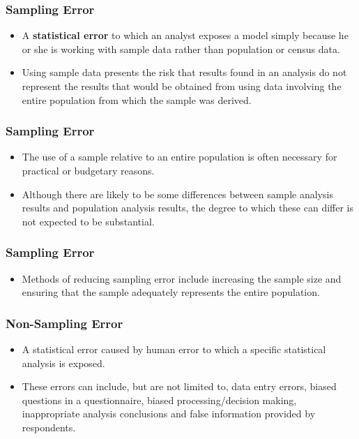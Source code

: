 \documentclass{beamer}
\begin{document}


\begin{frame}
\frametitle{Sampling Error}
\Large
\begin{itemize}
\item A \textbf{statistical error} to which an analyst exposes a model simply because he or she is working with sample data rather than population or census data.
\item Using sample data presents the risk that results found in an analysis do not represent the results that would be 
obtained from using data involving the entire population from which the sample was derived.
\end{itemize}
\end{frame}
\begin{frame}
\frametitle{Sampling Error}
\Large
\begin{itemize}
\item The use of a sample relative to an entire population is often necessary for practical or budgetary reasons. 
\item Although there are likely to be some differences between sample analysis results and population analysis results, the degree to which these can 
differ is not expected to be substantial. 
\end{itemize}
\end{frame}
\begin{frame}
\frametitle{Sampling Error}
\Large
\begin{itemize}
\item Methods of reducing sampling error include increasing the sample size and ensuring that the sample adequately represents the entire population.
\end{itemize}
\end{frame}
\begin{frame}
\frametitle{Non-Sampling Error}
\Large
\begin{itemize}

\item A statistical error caused by human error to which a specific statistical analysis is exposed. 
\item These errors can include, but are not limited to, data entry errors, biased questions in a
 questionnaire, biased processing/decision making, inappropriate analysis conclusions and false 
information provided by respondents.
\end{itemize}
\end{frame}
\end{document}
